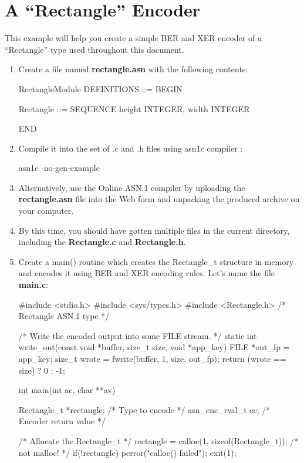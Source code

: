 \documentclass[english,oneside,12pt]{book}
\begin{document}
\section{A “Rectangle” Encoder}

This example will help you create a simple BER and XER encoder of
a ``Rectangle'' type used throughout this document.
\begin{enumerate}
\item Create a file named \textbf{rectangle.asn} with the following contents:

\begin{asn}
RectangleModule DEFINITIONS ::= BEGIN

Rectangle ::= SEQUENCE {
    height  INTEGER,
    width   INTEGER
}

END
\end{asn}
\item Compile it into the set of .c and .h files using asn1c compiler \cite{ASN1C}:

\begin{bash}
asn1c -no-gen-example %
\end{bash}
\item Alternatively, use the Online ASN.1 compiler \cite{AONL} by uploading
the \textbf{rectangle.asn} file into the Web form and unpacking the
produced archive on your computer.
\item By this time, you should have gotten multiple files in the current
directory, including the \textbf{Rectangle.c} and \textbf{Rectangle.h}.
\item Create a main() routine which creates the Rectangle\_t structure in
memory and encodes it using BER and XER encoding rules. Let's name
the file \textbf{main.c}:

\begin{example}
#include <stdio.h>
#include <sys/types.h>
#include <Rectangle.h>   /* Rectangle ASN.1 type  */

/* Write the encoded output into some FILE stream. */
static int write_out(const void *buffer, size_t size, void *app_key) {
    FILE *out_fp = app_key;
    size_t wrote = fwrite(buffer, 1, size, out_fp);
    return (wrote == size) ? 0 : -1;
}
 
int main(int ac, char **av) {
    Rectangle_t *rectangle; /* Type to encode        */
    asn_enc_rval_t ec;      /* Encoder return value  */

    /* Allocate the Rectangle_t */
    rectangle = calloc(1, sizeof(Rectangle_t)); /* not malloc! */
    if(!rectangle) {
        perror("calloc() failed");
        exit(1);
    }

}
\end{example}
\end{enumerate}
\end{document}
